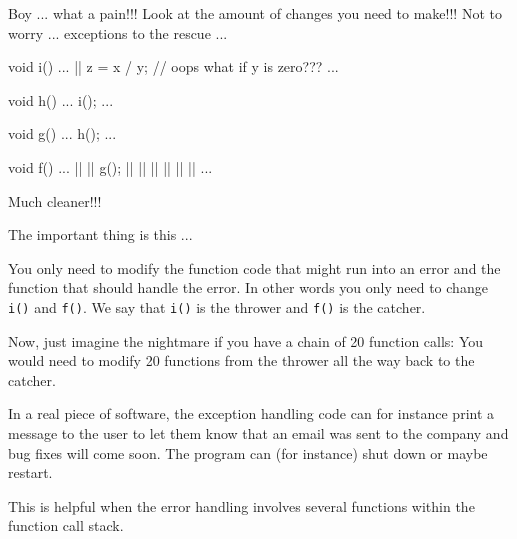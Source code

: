 Boy ... what a pain!!! Look at the amount of changes you need to make!!!
Not to worry ... exceptions to the rescue ...

\begin{consolethree}[escapeinside=||]%
void i()
{    
     ...
     ||
     z = x / y; // oops what if y is zero???
     ...
}

void h()
{    
     ...
     i();
     ...
}

void g()
{    
     ...
     h();
     ...
}

void f()
{    
     ...
     ||
     |\EMPHASIZE{\{}|
          g();
     |\EMPHASIZE{\}}|
     ||
     |\EMPHASIZE{\{}|
          ||
          ||
     |\EMPHASIZE{\}}|
     ...
}
\end{consolethree}

Much cleaner!!!

The important thing is this ...

You only need to modify the function code that might run into an error
and the function that should handle the error. In other words you only
need to change \texttt{i()} and \texttt{f()}. We say that \texttt{i()} is the
thrower and \texttt{f()} is the catcher.

Now, just imagine the nightmare if you have a chain of 20 function
calls: You would need to modify 20 functions from the thrower all the
way back to the catcher.

In a real piece of software, the exception handling code can for
instance print a message to the user to let them know that an email was
sent to the company and bug fixes will come soon. The program can (for
instance) shut down or maybe restart.

\newpage{}


This is helpful when the error handling involves several functions
within the function call stack.

